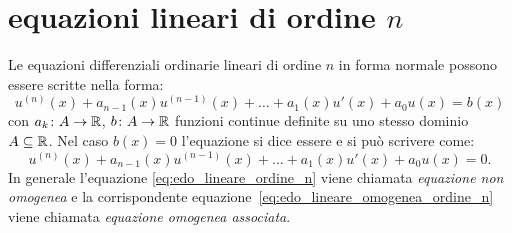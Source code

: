 \section{equazioni lineari di ordine $n$}
\label{sec:edo_lineari}

Le equazioni differenziali ordinarie lineari di ordine $n$ in forma normale possono essere scritte nella forma:
\begin{equation}\label{eq:edo_lineare_ordine_n}
  u^{(n)}(x) + a_{n-1}(x) u^{(n-1)}(x) + \dots + a_1(x) u'(x) + a_0 u(x) = b(x)
\end{equation}
con $a_k\colon A \to \mathbb R$, $b\colon A\to \mathbb R$ funzioni continue definite su uno stesso dominio $A\subseteq \mathbb R$.
Nel caso $b(x) = 0$ l'equazione si dice essere 
e si può scrivere come:
\begin{equation}\label{eq:edo_lineare_omogenea_ordine_n}
  u^{(n)}(x) + a_{n-1}(x) u^{(n-1)}(x) + \dots + a_1(x) u'(x) + a_0 u(x) = 0.
\end{equation}
In generale l'equazione \eqref{eq:edo_lineare_ordine_n}
viene chiamata \emph{equazione non omogenea}
e la corrispondente equazione~\eqref{eq:edo_lineare_omogenea_ordine_n}
viene chiamata \emph{equazione omogenea associata}.


